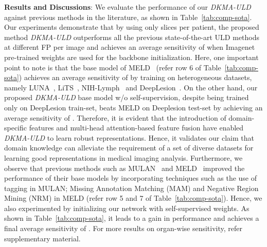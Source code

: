\documentclass{bmvc2k}
\begin{document}
\noindent \textbf{Results and Discussions}: We evaluate the performance of our \emph{DKMA-ULD} against previous methods in the literature, as shown in Table~\ref{tab:comp-sota}. Our experiments demonstrate that by using only  slices per patient, the proposed method \emph{DKMA-ULD} outperforms all the previous state-of-the-art ULD methods at different FP per image and achieves an average sensitivity of  when Imagenet pre-trained weights are used for the backbone initialization. Here, one important point to note is that the base model of MELD~\cite{meld} (refer row 6 of Table~\ref{tab:comp-sota}) achieves an average sensitivity of  by training on  heterogeneous datasets, namely LUNA~\cite{luna}, LiTS~\cite{lits}, NIH-Lymph~\cite{nih_lymph}
and DeepLesion~\cite{yan2018deeplesion}. On the other hand, our proposed \emph{DKMA-ULD} base model w/o self-supervision, despite being trained only on DeepLesion train-set, beats MELD on Deeplesion test-set by achieving an average sensitivity of . Therefore, it is evident that the introduction of domain-specific features and multi-head attention-based feature fusion have enabled \emph{DKMA-ULD} to learn robust representations. Hence, it validates our claim that domain knowledge can alleviate the requirement of a set of diverse datasets for learning good representations in medical imaging analysis. Furthermore, we observe that previous methods such as MULAN~\cite{yan2019mulan} and MELD~\cite{meld} improved the performance of their base models by incorporating techniques such as the use of tagging in MULAN; Missing Annotation Matching (MAM) and Negative Region Mining (NRM) in MELD (refer row 5 and 7 of Table~\ref{tab:comp-sota}). Hence, we also experimented by initializing our network with self-supervised weights. As shown in Table~\ref{tab:comp-sota}, it leads to a gain in performance and achieves a final average sensitivity of . For more results on organ-wise sensitivity, refer supplementary material.
\end{document}
